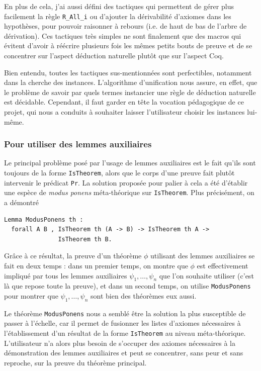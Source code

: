 \documentclass[a4paper]{article}
\theoremstyle{remark}
\theoremstyle{remark}
\theoremstyle{remark}
\theoremstyle{definition}
\theoremstyle{definition}
\theoremstyle{definition}
\begin{document}
En plus de cela, j'ai aussi défini des tactiques qui permettent de gérer plus facilement la règle \verb+R_All_i+ ou d'ajouter la dérivabilité d'axiomes dans les hypothèses, pour pouvoir raisonner à rebours (i.e. de haut de bas de l'arbre de dérivation). Ces tactiques très simples ne sont finalement que des macros qui évitent d'avoir à réécrire plusieurs fois les mêmes petits bouts de preuve et de se concentrer sur l'aspect déduction naturelle plutôt que sur l'aspect Coq.
\smallskip

Bien entendu, toutes les tactiques sus-mentionnées sont perfectibles, notamment dans la cherche des instances. L'algorithme d'unification nous assure, en effet, que le problème de savoir par quels termes instancier une règle de déduction naturelle est décidable. Cependant, il faut garder en tête la vocation pédagogique de ce projet, qui nous a conduits à souhaiter laisser l'utilisateur choisir les instances lui-même.

\subsubsection{Pour utiliser des lemmes auxiliaires}\label{sol}

Le principal problème posé par l'usage de lemmes auxiliaires est le fait qu'ils sont toujours de la forme \verb+IsTheorem+, alors que le corps d'une preuve fait plutôt intervenir le prédicat \verb+Pr+. La solution proposée pour palier à cela a été d'établir une espèce de \emph{modus ponens} méta-théorique sur \verb+IsTheorem+. Plus précisément, on a démontré
\begin{verbatim}
Lemma ModusPonens th :
  forall A B , IsTheorem th (A -> B) -> IsTheorem th A ->
               IsTheorem th B.

\end{verbatim}
Grâce à ce résultat, la preuve d'un théorème $\phi$ utilisant des lemmes auxiliaires se fait en deux temps : dans un premier temps, on montre que $\phi$ est effectivement impliqué par tous les lemmes auxiliaires $\psi_1, \ldots, \psi_n$ que l'on souhaite utiliser (c'est là que repose toute la preuve), et dans un second temps, on utilise \verb+ModusPonens+ pour montrer que $\psi_1, \ldots, \psi_n$ sont bien des théorèmes eux aussi.

Le théorème \verb+ModusPonens+ nous a semblé être la solution la plus susceptible de passer à l'échelle, car il permet de fusionner les listes d'axiomes nécessaires à l'établissement d'un résultat de la forme \verb+IsTheorem+ au niveau méta-théorique. L'utilisateur n'a alors plus besoin de s'occuper des axiomes nécessaires à la démonstration des lemmes auxiliaires et peut se concentrer, sans peur et sans reproche, sur la preuve du théorème principal.
\end{document}
